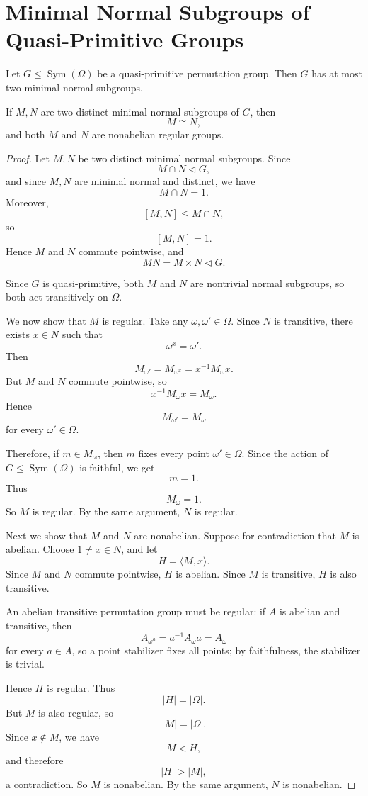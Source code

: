 \section{Minimal Normal Subgroups of Quasi-Primitive Groups}

\begin{lemma}
Let \(G\leq \operatorname{Sym}(\Omega)\) be a quasi-primitive permutation group. Then \(G\) has at most two minimal normal subgroups.

If \(M,N\) are two distinct minimal normal subgroups of \(G\), then
\[
M\cong N,
\]
and both \(M\) and \(N\) are nonabelian regular groups.
\end{lemma}

\begin{proof}
Let \(M,N\) be two distinct minimal normal subgroups. Since
\[
M\cap N\lhd G,
\]
and since \(M,N\) are minimal normal and distinct, we have
\[
M\cap N=1.
\]
Moreover,
\[
[M,N]\leq M\cap N,
\]
so
\[
[M,N]=1.
\]
Hence \(M\) and \(N\) commute pointwise, and
\[
MN=M\times N\lhd G.
\]

Since \(G\) is quasi-primitive, both \(M\) and \(N\) are nontrivial normal subgroups, so both act transitively on \(\Omega\).

We now show that \(M\) is regular. Take any \(\omega,\omega'\in\Omega\). Since \(N\) is transitive, there exists \(x\in N\) such that
\[
\omega^x=\omega'.
\]
Then
\[
M_{\omega'}
=
M_{\omega^x}
=
x^{-1}M_\omega x.
\]
But \(M\) and \(N\) commute pointwise, so
\[
x^{-1}M_\omega x=M_\omega.
\]
Hence
\[
M_{\omega'}=M_\omega
\]
for every \(\omega'\in\Omega\).

Therefore, if \(m\in M_\omega\), then \(m\) fixes every point \(\omega'\in\Omega\). Since the action of \(G\leq \operatorname{Sym}(\Omega)\) is faithful, we get
\[
m=1.
\]
Thus
\[
M_\omega=1.
\]
So \(M\) is regular. By the same argument, \(N\) is regular.

Next we show that \(M\) and \(N\) are nonabelian. Suppose for contradiction that \(M\) is abelian. Choose \(1\neq x\in N\), and let
\[
H=\langle M,x\rangle.
\]
Since \(M\) and \(N\) commute pointwise, \(H\) is abelian. Since \(M\) is transitive, \(H\) is also transitive.

An abelian transitive permutation group must be regular: if \(A\) is abelian and transitive, then
\[
A_{\omega^a}=a^{-1}A_\omega a=A_\omega
\]
for every \(a\in A\), so a point stabilizer fixes all points; by faithfulness, the stabilizer is trivial.

Hence \(H\) is regular. Thus
\[
|H|=|\Omega|.
\]
But \(M\) is also regular, so
\[
|M|=|\Omega|.
\]
Since \(x\notin M\), we have
\[
M<H,
\]
and therefore
\[
|H|>|M|,
\]
a contradiction. So \(M\) is nonabelian. By the same argument, \(N\) is nonabelian.


\end{proof}

